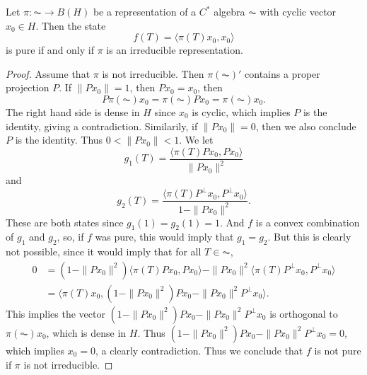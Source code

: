 \begin{theorem}
    Let $\pi: \AC \to B(H)$ be a representation of a $C^*$ algebra $\AC$ with cyclic vector $x_0 \in H$. Then the state
    \[ f(T) = \langle \pi(T) x_0, x_0 \rangle \]
    is pure if and only if $\pi$ is an irreducible representation.
\end{theorem}
\begin{proof}
    Assume that $\pi$ is not irreducible. Then $\pi(\AC)'$ contains a proper projection $P$. If $\| Px_0 \| = 1$, then $Px_0 = x_0$, then
    \[ P \pi(\AC) x_0 = \pi(\AC) Px_0 = \pi(\AC) x_0. \]
    The right hand side is dense in $H$ since $x_0$ is cyclic, which implies $P$ is the identity, giving a contradiction. Similarily, if $\| Px_0 \| = 0$, then we also conclude $P$ is the identity. Thus $0 < \| Px_0 \| < 1$. We let
    \[ g_1(T) = \frac{\langle \pi(T) Px_0, Px_0 \rangle}{\| Px_0 \|^2} \]
    and
    \[ g_2(T) = \frac{\langle \pi(T) P^\perp x_0, P^\perp x_0 \rangle}{1 - \| Px_0 \|^2}. \]
    These are both states since $g_1(1) = g_2(1) = 1$. And $f$ is a convex combination of $g_1$ and $g_2$, so, if $f$ was pure, this would imply that $g_1 = g_2$. But this is clearly not possible, since it would imply that for all $T \in \AC$,
    \begin{align*}
        0 &= (1 - \| Px_0 \|^2) \langle \pi(T) Px_0, Px_0 \rangle - \| Px_0 \|^2 \langle \pi(T) P^\perp x_0, P^\perp x_0 \rangle\\
        &= \langle \pi(T) x_0, (1 - \| Px_0 \|^2) Px_0 - \| Px_0 \|^2 P^\perp x_0 \rangle.
    \end{align*}
    This implies the vector $(1 - \| Px_0 \|^2) Px_0 - \| Px_0 \|^2 P^\perp x_0$ is orthogonal to $\pi(\AC) x_0$, which is dense in $H$. Thus $(1 - \| Px_0 \|^2) Px_0 - \| Px_0 \|^2 P^\perp x_0 = 0$, which implies $x_0 = 0$, a clearly contradiction. Thus we conclude that $f$ is not pure if $\pi$ is not irreducible.


\end{proof}
